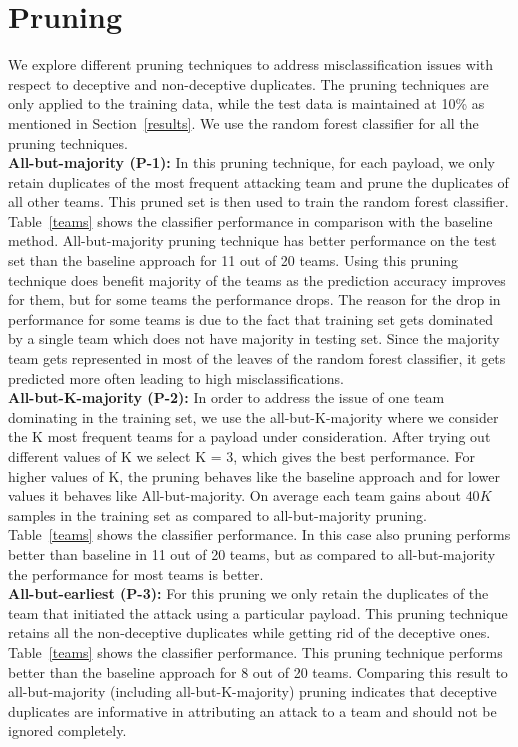 \documentclass[conference]{IEEEtran}
\begin{document}
\section{Pruning}
\label{prun}
We explore different pruning techniques to address misclassification issues with respect to deceptive and non-deceptive duplicates. The pruning techniques are only applied to the training data, while the test data is maintained at 10\% as mentioned in Section~\ref{results}. We use the random forest classifier for all the pruning techniques.\\

\noindent\textbf{All-but-majority (P-1):}
In this pruning technique, for each payload, we only retain duplicates of the most frequent attacking team and prune the duplicates of all other teams. This pruned set is then used to train the random forest classifier. Table~\ref{teams} shows the classifier performance in comparison with the baseline method. All-but-majority pruning technique has better performance on the test set than the baseline approach for 11 out of 20 teams. Using this pruning technique does benefit majority of the teams as the prediction accuracy improves for them, but for some teams the performance drops. The reason for the drop in performance for some teams is due to the fact that training set gets dominated by a single team which does not have majority in testing set. Since the majority team gets represented in most of the leaves of the random forest classifier, it gets predicted more often leading to high misclassifications.\smallskip \\
\noindent\textbf{All-but-K-majority (P-2):}
In order to address the issue of one team dominating in the training set, we use the all-but-K-majority where we consider the K most frequent teams for a payload under consideration. After trying out different values of K we select K = 3, which gives the best performance. For higher values of K, the pruning behaves like the baseline approach and for lower values it behaves like All-but-majority. On average each team gains about $40K$ samples in the training set as compared to all-but-majority pruning. Table~\ref{teams} shows the classifier performance. In this case also pruning performs better than baseline in 11 out of 20 teams, but as compared to all-but-majority the performance for most teams is better.\smallskip \\ 
\noindent\textbf{All-but-earliest (P-3):}
For this pruning we only retain the duplicates of the team that initiated the attack using a particular payload. This pruning technique retains all the non-deceptive duplicates while getting rid of the deceptive ones. Table~\ref{teams} shows the classifier performance. This pruning technique performs better than the baseline approach for 8 out of 20 teams. Comparing this result to all-but-majority (including all-but-K-majority) pruning indicates that deceptive duplicates are informative in attributing an attack to a team and should not be ignored completely.\smallskip \\
\end{document}
